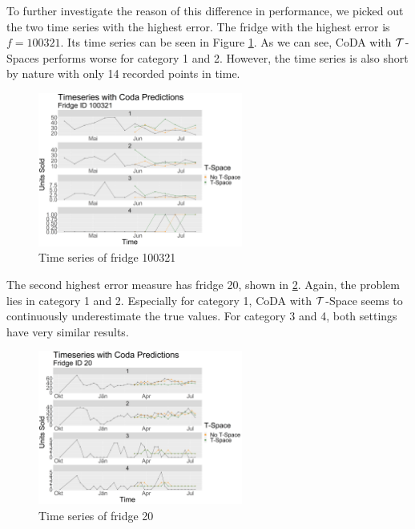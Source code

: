To further investigate the reason of this difference in performance, we picked out the two time series with the highest error. The fridge with the highest error is $f=100321$. Its time series can be seen in Figure \ref{fig:Coda_Timeseries_VariationtSpace100321}. As we can see, CoDA with $\mathcal{T}$-Spaces performs worse for category 1 and 2. However, the time series is also short by nature with only 14 recorded points in time.  

\begin{figure}[htbp]
	\centering
		\includegraphics[width=0.6\textwidth]{Graphiken/Coda_Timeseries_VariationtSpace100321.png}
	\caption{Time series of fridge 100321}
	\label{fig:Coda_Timeseries_VariationtSpace100321}
\end{figure}

The second highest error measure has fridge 20, shown in \ref{fig:Coda_Timeseries_VariationtSpace20}. Again, the problem lies in category 1 and 2. Especially for category 1, CoDA with $\mathcal{T}$-Space seems to continuously underestimate the true values. For category 3 and 4, both settings have very similar results.

\begin{figure}[htbp]
	\centering
		\includegraphics[width=0.6\textwidth]{Graphiken/Coda_Timeseries_VariationtSpace20.png}
	\caption{Time series of fridge 20}
	\label{fig:Coda_Timeseries_VariationtSpace20}
\end{figure}

